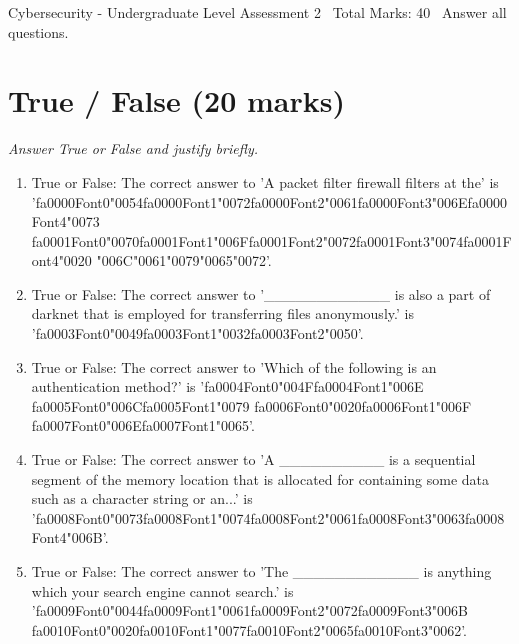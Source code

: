 \documentclass[12pt]{article}
\begin{document}
\begin{center}
Cybersecurity - Undergraduate Level Assessment 2 \
Total Marks: 40 \
Answer all questions.
\end{center}

\section*{True / False (20 marks)}
\textit{Answer True or False and justify briefly.}
\begin{enumerate}[label=\arabic*.]
\item True or False: The correct answer to 'A packet filter firewall filters at the' is '{\csname fa0000Font0\endcsname\char"0054}{\csname fa0000Font1\endcsname\char"0072}{\csname fa0000Font2\endcsname\char"0061}{\csname fa0000Font3\endcsname\char"006E}{\csname fa0000Font4\endcsname\char"0073} {\csname fa0001Font0\endcsname\char"0070}{\csname fa0001Font1\endcsname\char"006F}{\csname fa0001Font2\endcsname\char"0072}{\csname fa0001Font3\endcsname\char"0074}{\csname fa0001Font4\endcsname\char"0020} {\char"006C}{\char"0061}{\char"0079}{\char"0065}{\char"0072}'.
\item True or False: The correct answer to '\_\_\_\_\_\_\_\_\_\_\_\_ is also a part of darknet that is employed for transferring files anonymously.' is '{\csname fa0003Font0\endcsname\char"0049}{\csname fa0003Font1\endcsname\char"0032}{\csname fa0003Font2\endcsname\char"0050}'.
\item True or False: The correct answer to 'Which of the following is an authentication method?' is '{\csname fa0004Font0\endcsname\char"004F}{\csname fa0004Font1\endcsname\char"006E} {\csname fa0005Font0\endcsname\char"006C}{\csname fa0005Font1\endcsname\char"0079} {\csname fa0006Font0\endcsname\char"0020}{\csname fa0006Font1\endcsname\char"006F} {\csname fa0007Font0\endcsname\char"006E}{\csname fa0007Font1\endcsname\char"0065}'.
\item True or False: The correct answer to 'A \_\_\_\_\_\_\_\_\_\_ is a sequential segment of the memory location that is allocated for containing some data such as a character string or an...' is '{\csname fa0008Font0\endcsname\char"0073}{\csname fa0008Font1\endcsname\char"0074}{\csname fa0008Font2\endcsname\char"0061}{\csname fa0008Font3\endcsname\char"0063}{\csname fa0008Font4\endcsname\char"006B}'.
\item True or False: The correct answer to 'The \_\_\_\_\_\_\_\_\_\_\_\_ is anything which your search engine cannot search.' is '{\csname fa0009Font0\endcsname\char"0044}{\csname fa0009Font1\endcsname\char"0061}{\csname fa0009Font2\endcsname\char"0072}{\csname fa0009Font3\endcsname\char"006B} {\csname fa0010Font0\endcsname\char"0020}{\csname fa0010Font1\endcsname\char"0077}{\csname fa0010Font2\endcsname\char"0065}{\csname fa0010Font3\endcsname\char"0062}'.

\end{enumerate}
\end{document}
